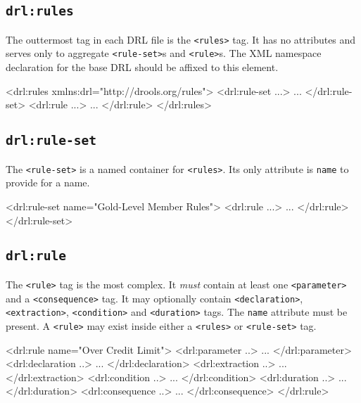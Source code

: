 \subsection{\texttt{drl:rules}}

The outtermost tag in each DRL file is the \verb|<rules>| tag.  It has
no attributes and serves only to aggregate \verb|<rule-set>|s and
\verb|<rule>|s. The XML namespace declaration for the base DRL should
be affixed to this element.

\begin{codelisting}
<drl:rules xmlns:drl="http://drools.org/rules">
\textcolor{light}{  <drl:rule-set ...>
    ...
  </drl:rule-set>
  <drl:rule ...>
    ...
  </drl:rule>}
</drl:rules>
\end{codelisting}

\subsection{\texttt{drl:rule-set}}

The \verb|<rule-set>| is a named container for \verb|<rules>|.  Its
only attribute is \verb|name| to provide for a name.  

\begin{codelisting}
<drl:rule-set name="Gold-Level Member Rules">
\textcolor{light}{  <drl:rule ...>
    ...
  </drl:rule>}
</drl:rule-set>
\end{codelisting}

\subsection{\texttt{drl:rule}}

The \verb|<rule>| tag is the most complex.  It \emph{must} contain
at least one \verb|<parameter>| and a \verb|<consequence>| tag.  It
may optionally contain \verb|<declaration>|, \verb|<extraction>|,
\verb|<condition>| and \verb|<duration>| tags.  The \verb|name|
attribute must be present. A \verb|<rule>| may exist inside either 
a \verb|<rules>| or \verb|<rule-set>| tag.

\begin{codelisting}
<drl:rule name="Over Credit Limit">
\textcolor{light}{  <drl:parameter ..>
    ...
  </drl:parameter>
  <drl:declaration ..>
    ...
  </drl:declaration>
  <drl:extraction ..>
    ...
  </drl:extraction>
  <drl:condition ..>
    ...
  </drl:condition>
  <drl:duration ..>
    ...
  </drl:duration>
  <drl:consequence ..>
    ...
  </drl:consequence>}
</drl:rule>
\end{codelisting}

